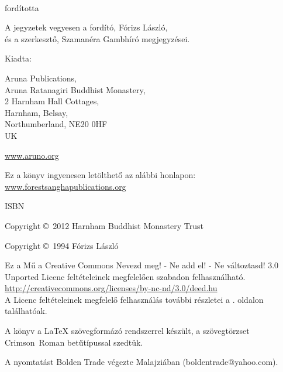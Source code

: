 {\small\setlength{\parskip}{0.8em}\setlength{\parindent}{0em}%
{\raggedright%

\thetitle\\
fordította \theauthor

A jegyzetek vegyesen a fordító, Fórizs László,\\
és a szerkesztő, Szamanéra Gambhíró megjegyzései.

Kiadta:

Aruna Publications,\\
Aruna Ratanagiri Buddhist Monastery,\\
2 Harnham Hall Cottages,\\
Harnham, Belsay,\\
Northumberland, NE20 0HF\\
UK

\href{http://aruno.org}{www.aruno.org}

Ez a könyv ingyenesen letölthető az alábbi honlapon:\\
\href{http://forestsanghapublications.org/}{www.forestsanghapublications.org}

ISBN \theISBN

Copyright \copyright\ 2012 Harnham Buddhist Monastery Trust

Copyright \copyright\ 1994 Fórizs László


\vfill

{\footnotesize

Ez a Mű a Creative Commons Nevezd meg! - Ne add el! - Ne változtasd! 3.0 Unported Licenc feltételeinek megfelelően szabadon felhasználható.\\
\href{http://creativecommons.org/licenses/by-nc-nd/3.0/deed.hu}{http://creativecommons.org/licenses/by-nc-nd/3.0/deed.hu}\\

A Licenc feltételeinek megfelelő felhasználás további részletei a \pageref{copyright-details}. oldalon találhatóak.

A könyv a {\selectfont\LaTeX} szövegformázó rendszerrel készült, a szövegtörzset Crimson~Roman betűtípussal szedtük.

\theEditionInfo

A nyomtatást Bolden Trade végezte Malajziában (boldentrade@yahoo.com).

}

}}

